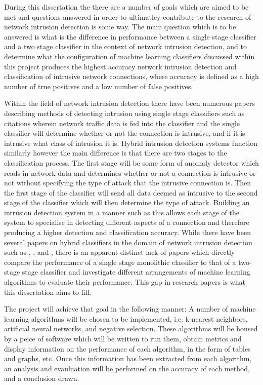 During this dissertation the there are a number of goals which are aimed to be met and questions answered in order to ultimatley contribute to the research of network intrusion detection is some way. The main question which is to be answered is what is the difference in performance between a single stage classifier and a two stage classifier in the context of network intrusion detection, and to determine what the configuration of machine learning classifiers discussed within this project produces the highest accuracy network intrusion detection and classification of intrusive network connections, where accuracy is defined as a high number of true positives and a low number of false positives.
	
	Within the field of network intrusion detection there have been numerous papers describing methods of detecting intrusion using single stage classifiers such as {citations} wherein network traffic data is fed into the classifier and the single classifier will determine whether or not the connection is intrusive, and if it is intrusive what class of intrusion it is. Hybrid intrusion detection systems function similarly however the main difference is that there are two stages to the classification process. The first stage will be some form of anomaly detector which reads in network data and determines whether or not a connection is intrusive or not without specifying the type of attack that the intrusive connection is. Then the first stage of the classifier will send all data deemed as intrusive to the second stage of the classifier which will then determine the type of attack. Building an intrusion detection system in a manner such as this allows each stage of the system to specialise in detecting different aspects of a connection and therefore producing a higher detection and classification accuracy. While there have been several papers on hybrid classifiers in the domain of network intrusion detection such as \cite{powers2008hybrid}, \cite{panda2012hybrid}, and \cite{zhang2006hybrid}, there is an apparent distinct lack of papers which directly compare the performance of a single stage monolithic classifier to that of a two-stage stage classifier and investigate different arrangements of machine learning algorithms to evaluate their performance. This gap in research papers is what this dissertation aims to fill.
	
	The project will achieve that goal in the following manner: A number of machine learning algorithms will be chosen to be implemented, i.e. k-nearest neighbors, artificial neural networks, and negative selection. These algorithms will be housed by a peice of software which will be written to run them, obtain metrics and display information on the performance of each algorithm, in the form of tables and graphs, etc. Once this information has been extracted from each algorithm, an analysis and evauluation will be performed on the accuracy of each method, and a conclusion drawn.
		
